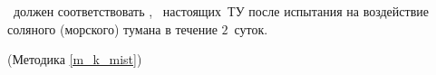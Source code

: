 \dut \ должен соответствовать \treb, \trebafter \ настоящих~ТУ после испытания на воздействие соляного (морского) тумана в течение $2$~суток.

\begin{flushright}
	(Методика \ref{m_k_mist})
\end{flushright}

